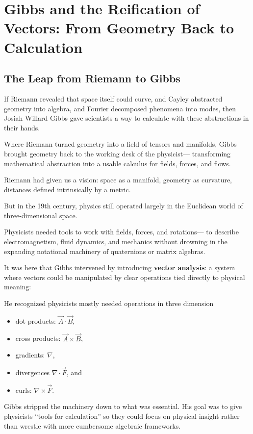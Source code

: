 \section{Gibbs and the Reification of Vectors: From Geometry Back to Calculation}


\subsection{The Leap from Riemann to Gibbs}

If Riemann revealed that space itself could curve,  
and Cayley abstracted geometry into algebra,  
and Fourier decomposed phenomena into modes,  
then Josiah Willard Gibbs gave scientists a way to calculate with these abstractions in their hands.

Where Riemann turned geometry into a field of tensors and manifolds,  
Gibbs brought geometry back to the working desk of the physicist—  
transforming mathematical abstraction into a usable calculus for fields, forces, and flows.

Riemann had given us a vision: space as a manifold, geometry as curvature, distances defined intrinsically by a metric.

But in the 19th century, physics still operated largely in the Euclidean world of three-dimensional space.

Physicists needed tools to work with fields, forces, and rotations—  
to describe electromagnetism, fluid dynamics, and mechanics without drowning in the expanding 
notational machinery of quaternions or matrix algebras.

It was here that Gibbs intervened by introducing \textbf{vector analysis}: a system where vectors could be manipulated by clear operations tied 
directly to physical meaning:

He recognized physicists mostly needed operations in three dimension
\begin{itemize}
    \item dot products: $\vec{A} \cdot \vec{B}$, 
    \item cross products: $\vec{A} \times \vec{B}$, 
    \item gradients: $\nabla$, 
    \item divergences $\nabla \cdot \vec{F}$, and
    \item curls: $\nabla \times \vec{F}$.
\end{itemize}

Gibbs stripped the machinery down to what was essential.  His goal was to give physicists “tools for calculation” 
so they could focus on physical insight rather than wrestle with more cumbersome algebraic frameworks.

